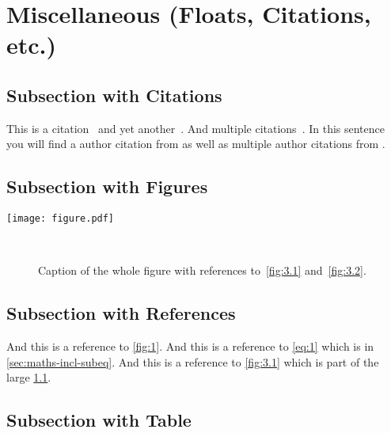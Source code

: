 

\chapter{Miscellaneous (Floats, Citations, etc.)}


\section{Subsection with Citations}
This is a citation~\autocite{D0.ConfNote.5607} and yet another~\autocite{PhysRevLett.100.192004}. And multiple citations~\autocite{PhysRevLett.74.2632, PhysRevLett.100.192004, PhysRevLett.74.2626}. In this sentence you will find a author citation from \textcite{Sitar1991} as well as multiple author citations from \textcites{PhysRevLett.74.2632, PhysRevLett.100.192004, PhysRevLett.74.2626}.
\blindtext


\section{Subsection with Figures}
\blindtext
%
\begin{figure*}[t]
  \centering
  \texttt{[image: figure.pdf]}
  \caption{\blindtext}
  \label{fig:1}
\end{figure*}
%
\blindtext
%
\begin{figure}[t]
  \centering
  ~
  \caption{Caption of the whole figure with references to~\cref{fig:3.1} and~\cref{fig:3.2}.}
  \label{fig:3}
\end{figure}
%
\blindtext


\section{Subsection with References}
And this is a reference to \cref{fig:1}. And this is a reference to \cref{eq:1} which is in \cref{sec:maths-incl-subeq}. And this is a reference to \cref{fig:3.1} which is part of the large \cref{fig:3}. \blindtext


\section{Subsection with Table}
\blindtext

